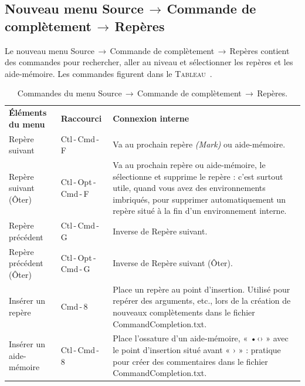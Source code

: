 \documentclass[11pt,french]{article}
\newcommand{\optkey}{\textsf{Opt}}
\newcommand{\ctlkey}{\textsf{Ctl}}
\newcommand{\cmdkey}{\textsf{Cmd}}
\newcommand{\mnu}[1]{\textsf{#1}}
\newcommand{\To}{\,\(\to\)\,}
\newcommand{\CCT}{\textsf{CommandCompletion.txt}}
\begin{document}
\subsection*{Nouveau menu \mnu{Source}\To\mnu{Commande de complètement}\To\mnu{Repères}}


Le nouveau menu \mnu{Source}\To\mnu{Commande de complètement}\To\mnu{Repères} contient des commandes pour 
rechercher, aller au niveau et sélectionner les repères et les aide-mémoire. Les commandes figurent 
dans le \textsc{Tableau}~.
\begin{table}[htbp]
\centering
\caption{Commandes du menu \mnu{Source}\To\mnu{Commande de complètement}\To\mnu{Repères}.\label{tbl:menu}}
\begin{tabular}{l l p{6.6cm}}
{\bfseries Éléments du menu} & {\bfseries Raccourci} & {\bfseries Connexion interne} \\
\cmidrule[0.5pt](lr){1-1} \cmidrule[0.5pt](lr){2-2} \cmidrule[0.5pt](lr){3-3}
\sffamily Repère suivant &  \ctlkey\,-\,\cmdkey\,-\,\textsf{F} & Va au prochain repère \emph{(Mark)} ou aide-mémoire. \\
\sffamily Repère suivant (Ôter) & \ctlkey\,-\,\optkey\,-\,\cmdkey\,-\,\textsf{F} & Va au prochain repère ou aide-mémoire, le sélectionne et supprime le repère : c'est surtout utile, quand vous avez des environnements imbriqués, pour supprimer automatiquement un repère situé à la fin d'un environnement interne.\\
\sffamily Repère précédent & \ctlkey\,-\,\cmdkey\,-\,\textsf{G} & Inverse de \textsf{Repère suivant}. \\
\sffamily Repère précédent (Ôter) & \ctlkey\,-\,\optkey\,-\,\cmdkey\,-\,\textsf{G} & Inverse de \textsf{Repère suivant (Ôter)}.  \\
\sffamily Insérer un repère & \cmdkey\,-\,\textsf{8} & Place un repère au point d'insertion. Utilisé pour repérer des arguments, etc., lors de la création de nouveaux complètements dans le fichier \CCT. \\
\sffamily Insérer un aide-mémoire & \ctlkey\,-\,\cmdkey\,-\,\textsf{8} & Place l'ossature d'un aide-mémoire, « •‹› » avec le point d'insertion situé avant « › » : pratique pour créer des commentaires dans le fichier \CCT. \\
\end{tabular}
\end{table}
\end{document}
